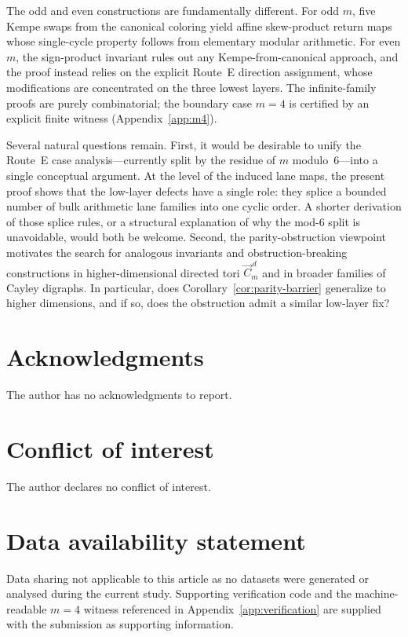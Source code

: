 \documentclass[11pt]{article}
\begin{document}
The odd and even constructions are fundamentally different.
For odd $m$, five Kempe swaps from the canonical coloring yield affine skew-product return maps whose single-cycle property follows from elementary modular arithmetic.
For even $m$, the sign-product invariant rules out any Kempe-from-canonical approach, and the proof instead relies on the explicit Route~E direction assignment, whose modifications are concentrated on the three lowest layers.
The infinite-family proofs are purely combinatorial; the boundary case $m=4$ is certified by an explicit finite witness (Appendix~\ref{app:m4}).

Several natural questions remain.
First, it would be desirable to unify the Route~E case analysis---currently split by the residue of $m$ modulo~$6$---into a single conceptual argument.
At the level of the induced lane maps, the present proof shows that the low-layer defects have a single role: they splice a bounded number of bulk arithmetic lane families into one cyclic order.
A shorter derivation of those splice rules, or a structural explanation of why the mod-$6$ split is unavoidable, would both be welcome.
Second, the parity-obstruction viewpoint motivates the search for analogous invariants and obstruction-breaking constructions in higher-dimensional directed tori $\vec C_m^{\,d}$ and in broader families of Cayley digraphs.
In particular, does Corollary~\ref{cor:parity-barrier} generalize to higher dimensions, and if so, does the obstruction admit a similar low-layer fix?

\section*{Acknowledgments}
The author has no acknowledgments to report.

\section*{Conflict of interest}
The author declares no conflict of interest.

\section*{Data availability statement}
Data sharing not applicable to this article as no datasets were generated or analysed during the current study.
Supporting verification code and the machine-readable $m=4$ witness referenced in Appendix~\ref{app:verification} are supplied with the submission as supporting information.
\end{document}
